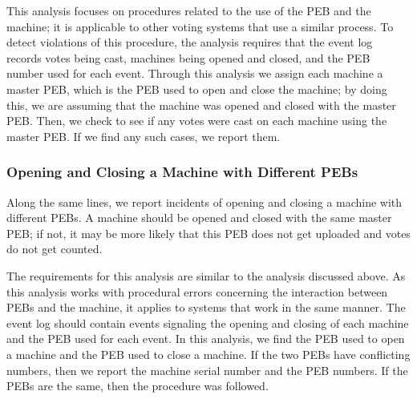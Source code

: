 This analysis focuses on procedures related to the use of the PEB and the machine; it is applicable to other voting systems that use a similar process.  To detect violations of this procedure, the analysis requires that the event log records votes being cast, machines being opened and closed, and the PEB number used for each event.  Through this analysis we assign each machine a master PEB, which is the PEB used to open and close the machine; by doing this, we are assuming that the machine was opened and closed with the master PEB.  Then, we check to see if any votes were cast on each machine using the master PEB.  If we find any such cases, we report them.  

\subsubsection{Opening and Closing a Machine with Different PEBs}
Along the same lines, we report incidents of opening and closing a machine with different PEBs. A machine should be opened and closed with the same master PEB; if not, it may be more likely that this PEB does not get uploaded and votes do not get counted.

The requirements for this analysis are similar to the analysis discussed above.  As this analysis works with procedural errors concerning the interaction between PEBs and the machine, it applies to systems that work in the same manner.  The event log should contain events signaling the opening and closing of each machine and the PEB used for each event.  In this analysis, we find the PEB used to open a machine and the PEB used to close a machine.  If the two PEBs have conflicting numbers, then we report the machine serial number and the PEB numbers.  If the PEBs are the same, then the procedure was followed.  

